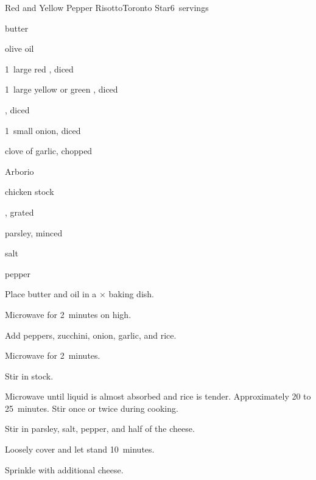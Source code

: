 \begin{recipe}{Red and Yellow Pepper Risotto}{Toronto Star}{6~servings}

\begin{ingredients}
\item {} butter
\item {} olive oil
\item 1~large red , diced
\item 1~large yellow or green , diced
\item {} , diced
\item 1~small onion, diced
\item clove of garlic, chopped
\item \C{1\threequarter} Arborio 
\item {} chicken stock
\item {} , grated
\item {} parsley, minced
\item salt
\item pepper
\end{ingredients}

\begin{directions}
\item Place butter and oil in a $\times$ baking dish.
\item Microwave for 2~minutes on high.
\item Add peppers, zucchini, onion, garlic, and rice.
\item Microwave for 2~minutes.
\item Stir in stock.
\item Microwave until liquid is almost absorbed and rice is tender. Approximately 20 to 25~minutes. Stir once or twice during cooking.
\item Stir in parsley, salt, pepper, and half of the cheese.
\item Loosely cover and let stand 10~minutes.
\item Sprinkle with additional cheese.
\end{directions}

\end{recipe}
